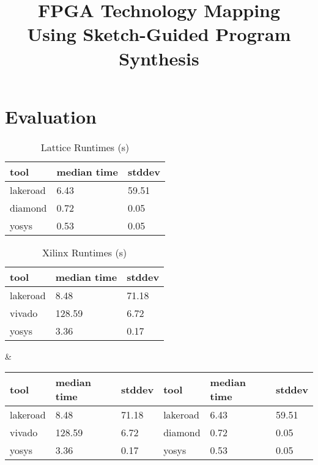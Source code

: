 \documentclass[pageno,inline]{jpaper}
\begin{document}
\title{FPGA Technology Mapping\\Using Sketch-Guided Program Synthesis}
\date{}
\maketitle

\thispagestyle{empty}

\section{Evaluation}
\begin{table}
    \caption{Lattice Runtimes (s)}
    \centering
    \begin{tabular}{|l|l|l|}
    \hline
        tool & median time & stddev \\ \hline
        lakeroad & 6.43 & 59.51 \\ \hline
        diamond & 0.72 & 0.05 \\ \hline
        yosys & 0.53 & 0.05 \\ \hline
    \end{tabular}
\end{table}
\begin{table}[!ht]
    \centering
    \caption{Xilinx Runtimes (s)}
    
    \begin{tabular}{|l|l|l|}
    \hline
        tool & median time & stddev \\ \hline
        lakeroad & 8.48 & 71.18 \\ \hline
        vivado & 128.59 & 6.72 \\ \hline
        yosys & 3.36 & 0.17 \\ \hline
    \end{tabular}
\end{table}
\begin{table}[!ht]
    \centering
     & 
    \begin{tabular}{|l|l|l::l|l|l|} \hline
         tool & median time & stddev & tool & median time & stddev \\ \hline
         lakeroad & 8.48 & 71.18 & lakeroad & 6.43 & 59.51 \\ \hline
         vivado & 128.59 & 6.72 & diamond & 0.72 & 0.05 \\ \hline
         yosys & 3.36 & 0.17 & yosys & 0.53 & 0.05 \\ \hline
    \end{tabular}
\end{table}
\end{document}
